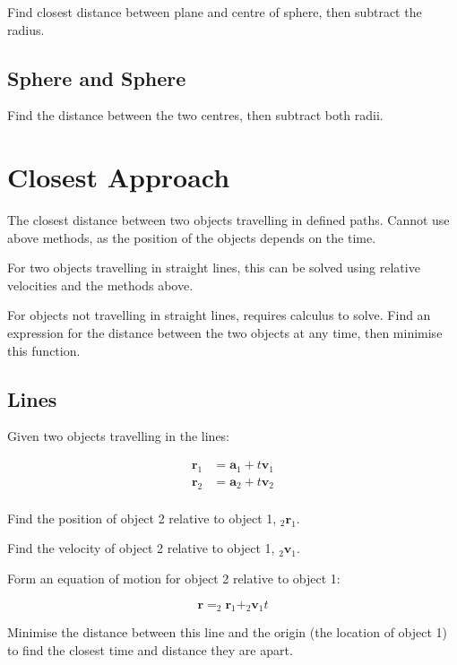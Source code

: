 \documentclass[a4paper,11pt]{article}
\newcommand{\bb}{\boldsymbol}
\begin{document}
Find closest distance between plane and centre of sphere, then subtract the
radius.


\subsection{Sphere and Sphere}

Find the distance between the two centres, then subtract both radii.




\section{Closest Approach}

The closest distance between two objects travelling in defined paths. Cannot
use above methods, as the position of the objects depends on the time.

For two objects travelling in straight lines, this can be solved using relative
velocities and the methods above.

For objects not travelling in straight lines, requires calculus to solve.
Find an expression for the distance between the two objects at any time, then
minimise this function.


\subsection{Lines}

Given two objects travelling in the lines:

$$
\begin{aligned}
\bb{r}_1 & = \bb{a}_1 + t \bb{v}_1 \\
\bb{r}_2 & = \bb{a}_2 + t \bb{v}_2 \\
\end{aligned}
$$

Find the position of object 2 relative to object 1, $_2\bb{r}_1$.

Find the velocity of object 2 relative to object 1, $_2\bb{v}_1$.

Form an equation of motion for object 2 relative to object 1:

$$
\bb{r} = _2\bb{r}_1 + _2\bb{v}_1 t
$$

Minimise the distance between this line and the origin (the location of object
1) to find the closest time and distance they are apart.
\end{document}
